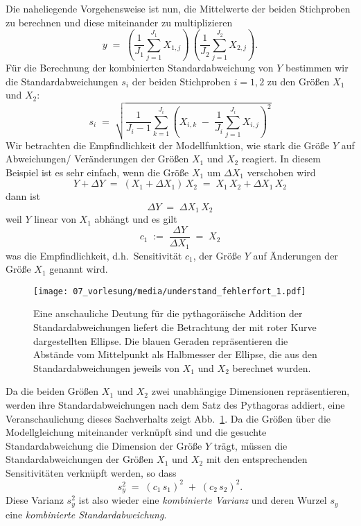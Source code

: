 Die naheliegende Vorgehensweise ist nun, die Mittelwerte der beiden Stichproben zu berechnen und
diese miteinander zu multiplizieren
\begin{equation}
y \; = \; \left(\frac{1}{J_1} \sum_{j=1}^{J_1} X_{1,j}\right) \,
          \left(\frac{1}{J_2} \sum_{j=1}^{J_2} X_{2,j}\right) .
\end{equation}
Für die Berechnung der kombinierten Standardabweichung von $Y$ bestimmen wir
die Standardabweichungen $s_i$ der beiden Stichproben $i = 1,2$ zu den Größen $X_1$ und $X_2$:
\begin{equation}
s_i \; = \; \sqrt{ \frac{1}{J_i - 1} \sum_{k=1}^{J_i}
 \left( X_{i,k} \; - \; \frac{1}{J_i} \sum_{j=1}^{J_i} X_{i,j}\right)^2 }
\end{equation}
Wir betrachten die Empfindlichkeit der Modellfunktion, wie stark die Größe $Y$ auf
Abweichungen/ Veränderungen der Größen $X_1$ und $X_2$ reagiert.
In diesem Beispiel ist es sehr einfach, wenn die Größe $X_1$ um $\Delta X_1$ verschoben wird
\begin{equation}
Y + \Delta Y \; = \; (X_1 + \Delta X_1) \, X_2 \; = \; X_1\, X_2 + \Delta X_1 \, X_2
\end{equation}
dann ist
\begin{equation}
\Delta Y \; = \; \Delta X_1 \, X_2
\end{equation}
weil $Y$ linear von $X_1$ abhängt und es gilt
\begin{equation}
c_1 \; := \; \frac{\Delta Y}{\Delta X_1} \; = \; X_2
\end{equation}
was die Empfindlichkeit, d.h.\ Sensitivität $c_1$, der Größe $Y$ auf Änderungen der Größe
$X_1$ genannt wird.
\begin{figure}
\begin{center}
\texttt{[image: 07\_vorlesung/media/understand\_fehlerfort\_1.pdf]}
\caption{\label{FortpfElliptisch} Eine anschauliche Deutung für die pythagoräische
Addition der Standardabweichungen liefert die Betrachtung der mit roter Kurve dargestellten
Ellipse. Die blauen Geraden repräsentieren die Abstände vom Mittelpunkt als Halbmesser
der Ellipse, die aus den Standardabweichungen jeweils von $X_1$ und $X_2$ berechnet wurden.}
\end{center}
\end{figure}
Da die beiden Größen $X_1$ und $X_2$ zwei unabhängige Dimensionen repräsentieren, werden
ihre Standardabweichungen nach dem Satz des Pythagoras addiert, eine Veranschaulichung dieses
Sachverhalts zeigt Abb.~\ref{FortpfElliptisch}. Da die Größen über die Modellgleichung
miteinander verknüpft sind und die gesuchte Standardabweichung die Dimension der Größe $Y$
trägt, müssen die Standardabweichungen der Größen $X_1$ und $X_2$ mit den entsprechenden
Sensitivitäten verknüpft werden, so dass
\begin{equation}
s_y^2 \; = \; (c_1 \, s_1)^2 \; + \; (c_2 \, s_2)^2 .
\end{equation}
Diese Varianz $s_y^2$ ist also wieder eine \textsl{kombinierte Varianz} und deren Wurzel
$s_y$ eine \textsl{kombinierte Standardabweichung}.

